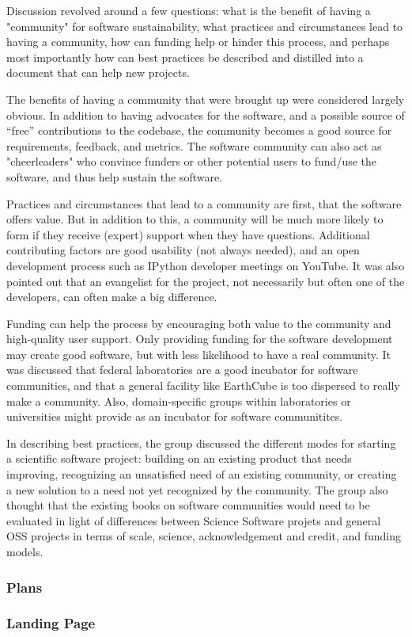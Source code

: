 Discussion revolved around a few questions: what is the benefit of having a "community" for software sustainability, what practices and circumstances lead to having a community, how can funding help or hinder this process, and perhaps most importantly how can best practices be described and distilled into a document that can help new projects.

The benefits of having a community that were brought up were considered largely obvious. In addition to having advocates for the software, and a possible source of ``free'' contributions to the codebase, the community becomes a good source for requirements, feedback, and metrics. The software community can also act as "cheerleaders" who convince funders or other potential users to fund/use the software, and thus help sustain the software.

Practices and circumstances that lead to a community are first, that the software offers value. But in addition to this, a community will be much more likely to form if they receive (expert) support when they have questions. Additional contributing factors are good usability (not always needed), and an open development process such as IPython developer meetings on YouTube. It was also pointed out that an evangelist for the project, not necessarily but often one of the developers, can often make a big difference. 

Funding can help the process by encouraging both value to the community and high-quality user support. Only providing funding for the software development may create good software, but with less likelihood to have a real community. It was discussed that federal laboratories are a good incubator for software communities, and that a general facility like EarthCube is too dispersed to really make a community. Also, domain-specific groups within laboratories or universities might provide as an incubator for software communitites.

In describing best practices, the group discussed the different modes for starting a scientific software project: building on an existing product that needs improving, recognizing an unsatisfied need of an existing community, or creating a new solution to a need not yet recognized by the community. The group also thought that the existing books on software communities would need to be evaluated in light of differences between Science Software projets and general OSS projects in terms of scale, science, acknowledgement and credit, and funding models.

\subsubsection{Plans}

\subsubsection{Landing Page}
